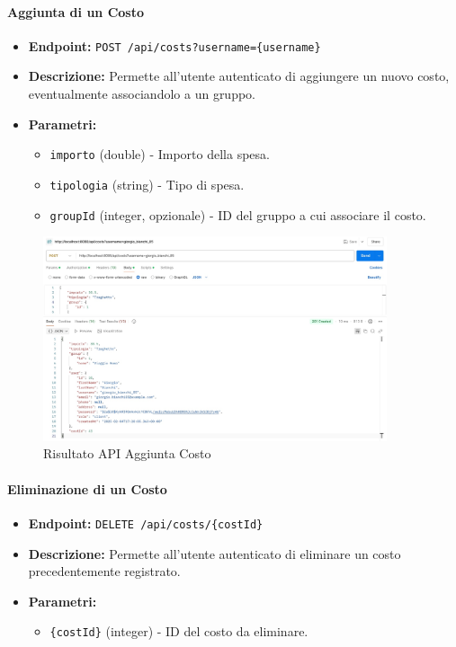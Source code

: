 \paragraph{Aggiunta di un Costo}  

\begin{itemize}
    \item \textbf{Endpoint:} \texttt{POST /api/costs?username=\{username\}}
    \item \textbf{Descrizione:} Permette all'utente autenticato di aggiungere un nuovo costo, eventualmente associandolo a un gruppo.
    \item \textbf{Parametri:}
    \begin{itemize}
        \item \texttt{importo} (double) - Importo della spesa.
        \item \texttt{tipologia} (string) - Tipo di spesa.
        \item \texttt{groupId} (integer, opzionale) - ID del gruppo a cui associare il costo.
    \end{itemize}
\end{itemize}
\newpage
\begin{figure}[h!]
    \centering
    \includegraphics[width=0.9\textwidth]{images/createCost.jpeg}
    \caption{Risultato API Aggiunta Costo}
    \label{fig:api_add_cost}
\end{figure}

\paragraph{Eliminazione di un Costo}  

\begin{itemize}
    \item \textbf{Endpoint:} \texttt{DELETE /api/costs/\{costId\}}
    \item \textbf{Descrizione:} Permette all'utente autenticato di eliminare un costo precedentemente registrato.
    \item \textbf{Parametri:}
    \begin{itemize}
        \item \texttt{\{costId\}} (integer) - ID del costo da eliminare.
    \end{itemize}
\end{itemize}


